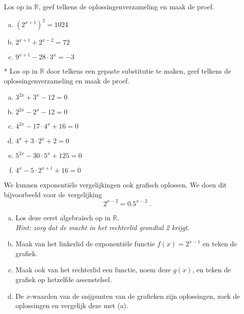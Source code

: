 \documentclass[12pt,twoside]{article}
\begin{document}
\begin{oefening}
Los op in $\mathbb{R}$, geef telkens de oplossingenverzameling en maak de proef.
\begin{multicols}{3}
\begin{enumerate}[(a)]
  \itemsep.5em
  \item $\left(2^{x+1}\right)^2=1024$
  \item $2^{x+1}+2^{x-2}=72$
  \item $9^{x+1}-28\cdot 3^x=-3$
\end{enumerate}
\end{multicols}
\end{oefening}

\begin{oefening}*
Los op in $\mathbb{R}$ door telkens een gepaste substitutie te maken, geef telkens de oplossingenverzameling en maak de proef.
\begin{multicols}{2}
\begin{enumerate}[(a)]
  \item $3^{2x}+3^x-12=0$
  \item $2^{2x}-2^x-12=0$
  \item $4^{2x}-17\cdot 4^x + 16=0$
  \item $4^x+3\cdot 2^x+2=0$
  \item $5^{2x}-30\cdot 5^x+125=0$
  \item $4^x-5\cdot 2^{x+1}+16=0$
\end{enumerate}
\end{multicols}
\end{oefening}

\begin{oefening}
We kunnen exponentiële vergelijkingen ook grafisch oplossen. We doen dit bijvoorbeeld voor de vergelijking
$$2^{x-2}=0.5^{x-2}\;.$$
\begin{enumerate}[(a)]
  \item Los deze eerst algebraïsch op in $\mathbb{R}$.\\
        {\em Hint: zorg dat de macht in het rechterlid grondtal 2 krijgt.}
  \item Maak van het linkerlid de exponentiële functie $f(x)=2^{x-1}$ en teken de grafiek.
  \item Maak ook van het rechterlid een functie, noem deze $g(x)$, en teken de grafiek op hetzelfde assenstelsel.
  \item De $x$-waarden van de snijpunten van de grafieken zijn oplossingen, zoek de oplossingen en vergelijk deze met (a).
\end{enumerate}
\end{oefening}
\end{document}
